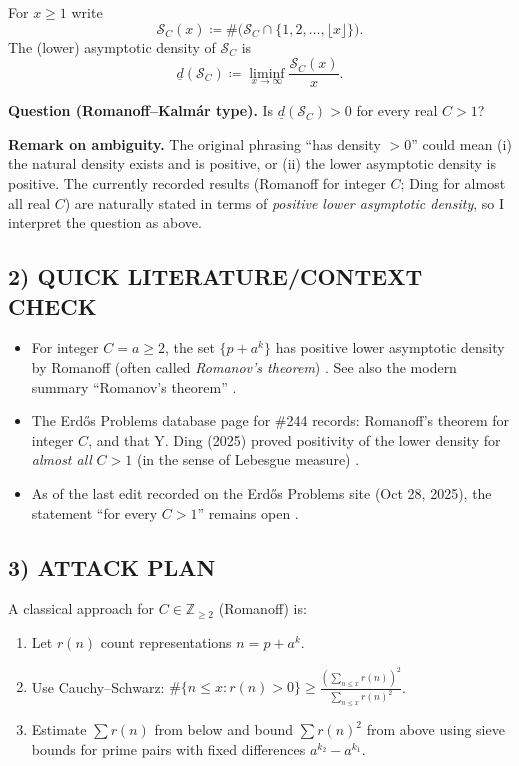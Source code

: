 For $x\ge 1$ write
\[
\mathcal{S}_C(x) \coloneqq \#\bigl(\mathcal{S}_C\cap\{1,2,\dots,\lfloor x\rfloor\}\bigr).
\]
The (lower) asymptotic density of $\mathcal{S}_C$ is
\[
\underline{d}(\mathcal{S}_C) \coloneqq \liminf_{x\to\infty} \frac{\mathcal{S}_C(x)}{x}.
\]

\noindent\textbf{Question (Romanoff--Kalm\'ar type).} Is $\underline{d}(\mathcal{S}_C)>0$ for every real $C>1$?

\medskip
\noindent\textbf{Remark on ambiguity.} The original phrasing ``has density $>0$'' could mean (i) the natural density exists and is positive, or (ii) the lower asymptotic density is positive. The currently recorded results (Romanoff for integer $C$; Ding for almost all real $C$) are naturally stated in terms of \emph{positive lower asymptotic density}, so I interpret the question as above.

\subsection*{2) QUICK LITERATURE/CONTEXT CHECK}
\begin{itemize}[leftmargin=2em]
\item For integer $C=a\ge 2$, the set $\{p+a^k\}$ has positive lower asymptotic density by Romanoff (often called \emph{Romanov's theorem}) \cite{Romanoff1934}. See also the modern summary ``Romanov's theorem'' \cite{WikipediaRomanov}.
\item The Erd\H{o}s Problems database page for \#244 records: Romanoff's theorem for integer $C$, and that Y. Ding (2025) proved positivity of the lower density for \emph{almost all} $C>1$ (in the sense of Lebesgue measure) \cite{ErdosProblems244,Ding2025}.
\item As of the last edit recorded on the Erd\H{o}s Problems site (Oct 28, 2025), the statement ``for every $C>1$'' remains open \cite{ErdosProblems244}.
\end{itemize}

\subsection*{3) ATTACK PLAN}
A classical approach for $C\in\mathbb{Z}_{\ge 2}$ (Romanoff) is:
\begin{enumerate}[leftmargin=2em]
\item Let $r(n)$ count representations $n=p+a^k$.
\item Use Cauchy--Schwarz: $\#\{n\le x:r(n)>0\}\ge \frac{(\sum_{n\le x} r(n))^2}{\sum_{n\le x} r(n)^2}$.
\item Estimate $\sum r(n)$ from below and bound $\sum r(n)^2$ from above using sieve bounds for prime pairs with fixed differences $a^{k_2}-a^{k_1}$.
\end{enumerate}

